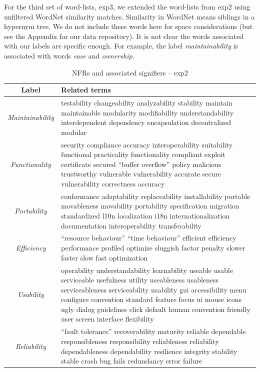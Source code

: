 \documentclass[]{sig-alternate}
\begin{document}
For the third set of word-lists,  \textsf{exp3}, we extended the word-lists from \textsf{exp2} using unfiltered WordNet similarity matches. 
Similarity in WordNet means siblings in a hypernym tree. 
We do not include these words here for space considerations (but see the Appendix for our data repository). 
It is not clear the words associated with our labels are specific enough. For example, the label \emph{maintainability} is associated with words \emph{ease} and \emph{ownership}.

\begin{table}
	\centering
\begin{tabular}{c|p{11cm}}
\toprule
\textbf{Label} & \textbf{Related terms} \\
\midrule
\emph{Maintainability} &
testability changeability analyzability stability maintain maintainable modularity modifiability understandability interdependent dependency encapsulation decentralized modular\\ \hline
\emph{Functionality} &
security compliance accuracy interoperability suitability functional practicality functionality compliant exploit certificate secured ``buffer overflow'' policy malicious trustworthy vulnerable vulnerability accurate secure vulnerability correctness accuracy\\ \hline
\emph{Portability} &
conformance adaptability replaceability installability portable movableness movability portability specification migration standardized l10n localization i18n internationalization documentation interoperability transferability\\ \hline
\emph{Efficiency} &
``resource behaviour'' ``time behaviour'' efficient efficiency performance profiled optimize sluggish factor penalty slower faster slow fast optimization\\ \hline
\emph{Usability} &
operability understandability learnability useable usable serviceable usefulness utility useableness usableness serviceableness serviceability usability gui accessibility menu configure convention standard feature focus ui mouse icons ugly dialog guidelines click default human convention friendly user screen interface flexibility\\ \hline
\emph{Reliability} &
``fault tolerance'' recoverability maturity reliable dependable responsibleness responsibility reliableness reliability dependableness dependability resilience integrity stability stable crash bug fails redundancy error failure\\ 
\bottomrule
\end{tabular}
	\caption{NFRs and associated signifiers -- \textsf{exp2}}
	\label{tbl:wnsig}

\end{table}
\end{document}
